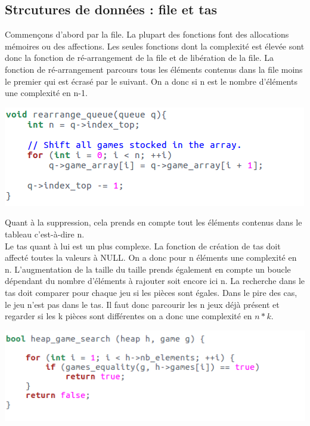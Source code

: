 \documentclass{article}
\begin{document}
\subsection{Strcutures de données : file et tas}

Commençons d'abord par la file. La plupart des fonctions font des allocations mémoires ou des affections. Les seules fonctions dont la complexité est élevée sont donc la fonction de ré-arrangement de la file et de libération de la file. La fonction de ré-arrangement parcours tous les éléments contenus dans la file moins le premier qui est écrasé par le suivant. On a donc si n est le nombre d'éléments une complexité en n-1.


\begin{flushleft}
\includegraphics[scale=0.45]{triqueue.png}
\end{flushleft}

Quant à la suppression, cela prends en compte tout les éléments contenus dans le tableau c'est-à-dire n.\\

Le tas quant à lui est un plus complexe. La fonction de création de tas doit affecté toutes la valeurs à NULL. On a donc pour n éléments une complexité en n. L'augmentation de la taille du taille prends également en compte un boucle dépendant du nombre d'éléments à rajouter soit encore ici n. 
La recherche dans le tas doit comparer pour chaque jeu si les pièces sont égales. Dans le pire des cas, le jeu n'est pas dans le tas. Il faut donc parcourir les n jeux déjà présent et regarder si les k pièces sont différentes on a donc une complexité en $n*k$.

\begin{flushleft}
\includegraphics[scale=0.45]{recherchetas.png}
\end{flushleft}
\end{document}

